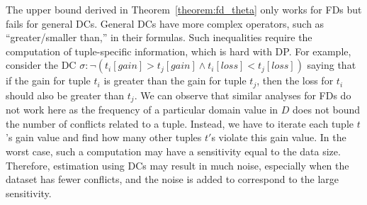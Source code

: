 The upper bound derived in Theorem~\ref{theorem:fd_theta}
only works for FDs but fails for general DCs. General DCs have more complex operators, such as ``greater/smaller than,'' in their formulas. Such inequalities require the computation of tuple-specific information, which is hard with DP. For example, consider the DC $\sigma: \neg(t_i[gain] > t_j[gain] \land t_i[loss] < t_j[loss])$ saying that if the gain for tuple $t_i$ is greater than the gain for tuple $t_j$, then the loss for $t_i$ should also be greater than $t_j$. We can observe that similar analyses for FDs do not work here as the frequency of a particular domain value in $D$ does not bound the number of conflicts related to a tuple. 
Instead, we have to iterate each tuple $t$'s gain value and find how many other tuples $t'$s violate this gain value. In the worst case, such a computation may have a sensitivity equal to the data size. Therefore, estimation using DCs may result in much noise, especially when the dataset has fewer conflicts, and the noise is added to correspond to the large sensitivity.

